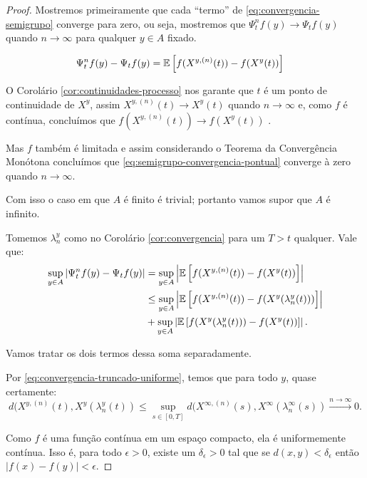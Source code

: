 \begin{proof}

  Mostremos primeiramente que cada ``termo'' de
  \eqref{eq:convergencia-semigrupo} converge para zero, ou seja,
  mostremos que $\Psi^n_t f (y) \to \Psi_t f(y)$ quando $n \to \infty$
  para qualquer $y \in A$ fixado.

  \begin{align}
    \label{eq:semigrupo-convergencia-pontual}
    \Psi^n_t f (y) -\Psi_t f(y) &=
    {\mathbb{E}} \left[
      f(X^{y, (n)}(t)) - f(X^y(t))
    \right]
  \end{align}

  O Corolário \ref{cor:continuidades-processo} nos garante que $t$ é
  \qc um ponto de continuidade de $X^y$, assim $X^{y, (n)}(t) \to
  X^y(t)$ \qc quando $n \to \infty$ e, como $f$ é contínua, concluímos
  que $f(X^{y, (n)}(t)) \to f(X^y(t))$ \qc.

  Mas $f$ também é limitada e assim considerando o Teorema da
  Convergência Monótona concluímos que
  \eqref{eq:semigrupo-convergencia-pontual} converge à zero quando $n
  \to \infty$.

  Com isso o caso em que $A$ é finito é trivial; portanto vamos supor
  que $A$ é infinito.

  Tomemos $\lambda_n^y$ como no Corolário \ref{cor:convergencia} para
  um $T > t$ qualquer. Vale que:
  \begin{align}
    \label{eq:esperancas-markov}
    \sup_{y \in A} | \Psi^n_t f (y) - \Psi_t f(y) | 
    &= \sup_{y \in A} \left\lvert {\mathbb{E}} \left[f(X^{y, (n)}(t)) -
        f(X^y(t)) \right]\right\rvert \\
    &\leq \sup_{y\in A}\left\lvert {\mathbb{E}} \left[f(X^{y, (n)}(t)) -
        f(X^y(\lambda_n^y(t))) \right]
    \right\rvert \notag \\
    &+ \sup_{y\in A}\left\lvert {\mathbb{E}} \left[f(X^y(\lambda_n^y(t))) -
        f(X^y(t)) \right] \right\rvert. \notag
  \end{align}

  Vamos tratar os dois termos dessa soma separadamente.

  Por \eqref{eq:convergencia-truncado-uniforme}, temos que para todo
  $y$, quase certamente:
  \begin{equation}
    \label{eq:dist-uniforme}
    d(X^{y, (n)}(t), X^y(\lambda_n^y(t)) \leq
    \sup_{s \in [0, T]} d(X^{\infty, (n)}(s), X^\infty(\lambda_n^\infty(s))
    \xrightarrow{n\to\infty} 0.
  \end{equation}
  
  Como $f$ é uma função contínua em um espaço compacto,  ela é
  uniformemente contínua. Isso é, para todo $\epsilon > 0$, existe um
  $\delta_\epsilon > 0$ tal que se $d(x, y) < \delta_\epsilon$ então
  $|f(x)-f(y)| < \epsilon$.


\end{proof}
